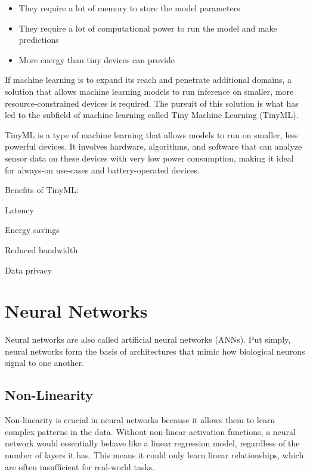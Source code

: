 \documentclass[12pt, a4paper]{article}
\begin{document}
\begin{itemize}[nosep]
    \item They require a lot of memory to store the model parameters
    \item They require a lot of computational power to run the model and make predictions
    \item More energy than tiny devices can provide
\end{itemize}

\vspace{1em}
If machine learning is to expand its reach and penetrate additional domains, a solution that allows machine learning models to run inference on smaller, more resource-constrained devices is required. The pursuit of this solution is what has led to the subfield of machine learning called Tiny Machine Learning (TinyML). 

\vspace{1em}
TinyML is a type of machine learning that allows models to run on smaller, less powerful devices. It involves hardware, algorithms, and software that can analyze sensor data on these devices with very low power consumption, making it ideal for always-on use-cases and battery-operated devices.

\vspace{1em}
Benefits of TinyML:
\begin{itemize}[nosep]
    \begin{minipage}[t]{0.45\textwidth}
        \item Latency
        \item Energy savings
    \end{minipage}
    \hfill
    \begin{minipage}[t]{0.45\textwidth}
        \item Reduced bandwidth
        \item Data privacy
    \end{minipage}
\end{itemize}

\section{Neural Networks}
Neural networks are also called artificial neural networks (ANNs). Put simply, neural networks form the basis of architectures that mimic how biological neurons signal to one another. 


\subsection{Non-Linearity}
Non-linearity is crucial in neural networks because it allows them to learn complex patterns in the data. Without non-linear activation functions, a neural network would essentially behave like a linear regression model, regardless of the number of layers it has. This means it could only learn linear relationships, which are often insufficient for real-world tasks.
\end{document}
